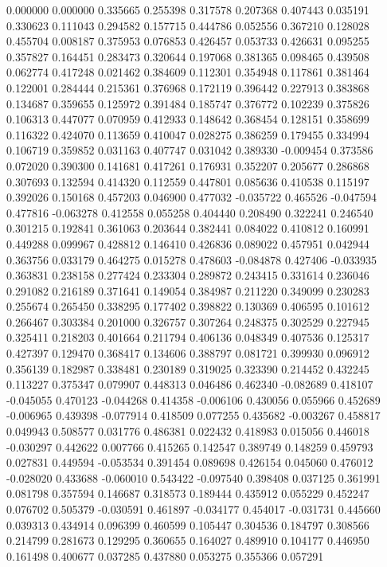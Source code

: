 0.000000
0.000000
0.335665
0.255398
0.317578
0.207368
0.407443
0.035191
0.330623
0.111043
0.294582
0.157715
0.444786
0.052556
0.367210
0.128028
0.455704
0.008187
0.375953
0.076853
0.426457
0.053733
0.426631
0.095255
0.357827
0.164451
0.283473
0.320644
0.197068
0.381365
0.098465
0.439508
0.062774
0.417248
0.021462
0.384609
0.112301
0.354948
0.117861
0.381464
0.122001
0.284444
0.215361
0.376968
0.172119
0.396442
0.227913
0.383868
0.134687
0.359655
0.125972
0.391484
0.185747
0.376772
0.102239
0.375826
0.106313
0.447077
0.070959
0.412933
0.148642
0.368454
0.128151
0.358699
0.116322
0.424070
0.113659
0.410047
0.028275
0.386259
0.179455
0.334994
0.106719
0.359852
0.031163
0.407747
0.031042
0.389330
-0.009454
0.373586
0.072020
0.390300
0.141681
0.417261
0.176931
0.352207
0.205677
0.286868
0.307693
0.132594
0.414320
0.112559
0.447801
0.085636
0.410538
0.115197
0.392026
0.150168
0.457203
0.046900
0.477032
-0.035722
0.465526
-0.047594
0.477816
-0.063278
0.412558
0.055258
0.404440
0.208490
0.322241
0.246540
0.301215
0.192841
0.361063
0.203644
0.382441
0.084022
0.410812
0.160991
0.449288
0.099967
0.428812
0.146410
0.426836
0.089022
0.457951
0.042944
0.363756
0.033179
0.464275
0.015278
0.478603
-0.084878
0.427406
-0.033935
0.363831
0.238158
0.277424
0.233304
0.289872
0.243415
0.331614
0.236046
0.291082
0.216189
0.371641
0.149054
0.384987
0.211220
0.349099
0.230283
0.255674
0.265450
0.338295
0.177402
0.398822
0.130369
0.406595
0.101612
0.266467
0.303384
0.201000
0.326757
0.307264
0.248375
0.302529
0.227945
0.325411
0.218203
0.401664
0.211794
0.406136
0.048349
0.407536
0.125317
0.427397
0.129470
0.368417
0.134606
0.388797
0.081721
0.399930
0.096912
0.356139
0.182987
0.338481
0.230189
0.319025
0.323390
0.214452
0.432245
0.113227
0.375347
0.079907
0.448313
0.046486
0.462340
-0.082689
0.418107
-0.045055
0.470123
-0.044268
0.414358
-0.006106
0.430056
0.055966
0.452689
-0.006965
0.439398
-0.077914
0.418509
0.077255
0.435682
-0.003267
0.458817
0.049943
0.508577
0.031776
0.486381
0.022432
0.418983
0.015056
0.446018
-0.030297
0.442622
0.007766
0.415265
0.142547
0.389749
0.148259
0.459793
0.027831
0.449594
-0.053534
0.391454
0.089698
0.426154
0.045060
0.476012
-0.028020
0.433688
-0.060010
0.543422
-0.097540
0.398408
0.037125
0.361991
0.081798
0.357594
0.146687
0.318573
0.189444
0.435912
0.055229
0.452247
0.076702
0.505379
-0.030591
0.461897
-0.034177
0.454017
-0.031731
0.445660
0.039313
0.434914
0.096399
0.460599
0.105447
0.304536
0.184797
0.308566
0.214799
0.281673
0.129295
0.360655
0.164027
0.489910
0.104177
0.446950
0.161498
0.400677
0.037285
0.437880
0.053275
0.355366
0.057291
